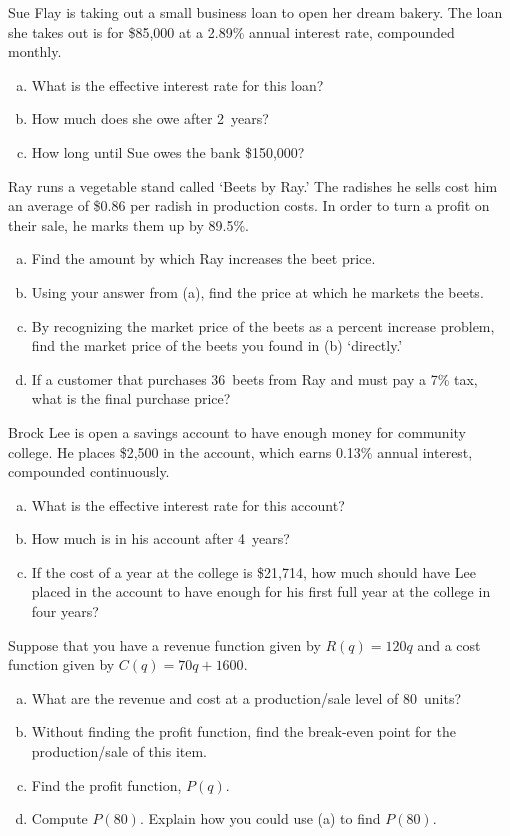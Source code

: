 \documentclass[11pt,letterpaper]{article}
\begin{document}
\prob Sue Flay is taking out a small business loan to open her dream bakery. The loan she takes out is for \$85,000 at a 2.89\% annual interest rate, compounded monthly.
	\begin{enumerate}[(a)]
	\item What is the effective interest rate for this loan?
	\item How much does she owe after 2~years?
	\item How long until Sue owes the bank \$150,000?
	\end{enumerate} \pspace


\prob Ray runs a vegetable stand called `Beets by Ray.' The radishes he sells cost him an average of \$0.86 per radish in production costs. In order to turn a profit on their sale, he marks them up by 89.5\%.
	\begin{enumerate}[(a)]
	\item Find the amount by which Ray increases the beet price.
	\item Using your answer from (a), find the price at which he markets the beets.
	\item By recognizing the market price of the beets as a percent increase problem, find the market price of the beets you found in (b) `directly.'
	\item If a customer that purchases 36~beets from Ray and must pay a 7\% tax, what is the final purchase price?
	\end{enumerate} \pspace


\prob Brock Lee is open a savings account to have enough money for community college. He places \$2,500 in the account, which earns 0.13\% annual interest, compounded continuously.
	\begin{enumerate}[(a)]
	\item What is the effective interest rate for this account?
	\item How much is in his account after 4~years?
	\item If the cost of a year at the college is \$21,714, how much should have Lee placed in the account to have enough for his first full year at the college in four years?
	\end{enumerate} \pspace


\prob Suppose that you have a revenue function given by $R(q)= 120q$ and a cost function given by $C(q)= 70q + 1600$. 
	\begin{enumerate}[(a)]
	\item What are the revenue and cost at a production/sale level of 80~units?
	\item Without finding the profit function, find the break-even point for the production/sale of this item.
	\item Find the profit function, $P(q)$.
	\item Compute $P(80)$. Explain how you could use (a) to find $P(80)$. 
	\end{enumerate} \pspace
\end{document}
